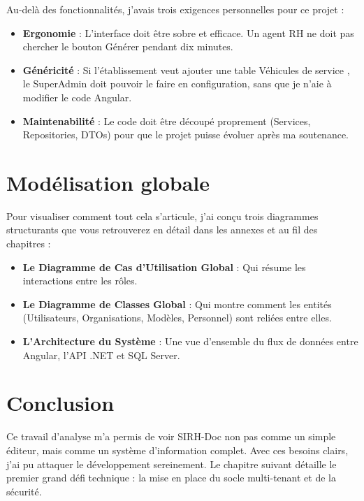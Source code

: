 Au-delà des fonctionnalités, j'avais trois exigences personnelles pour ce projet :
\begin{itemize}
    \item \textbf{Ergonomie} : L'interface doit être sobre et efficace. Un agent RH ne doit pas chercher le bouton \og Générer \fg{} pendant dix minutes.
    \item \textbf{Généricité} : Si l'établissement veut ajouter une table \og Véhicules de service \fg{}, le SuperAdmin doit pouvoir le faire en configuration, sans que je n'aie à modifier le code Angular.
    \item \textbf{Maintenabilité} : Le code doit être découpé proprement (Services, Repositories, DTOs) pour que le projet puisse évoluer après ma soutenance.
\end{itemize}

\section{Modélisation globale}

Pour visualiser comment tout cela s'articule, j'ai conçu trois diagrammes structurants que vous retrouverez en détail dans les annexes et au fil des chapitres :
\begin{itemize}
    \item \textbf{Le Diagramme de Cas d'Utilisation Global} : Qui résume les interactions entre les rôles.
    \item \textbf{Le Diagramme de Classes Global} : Qui montre comment les entités (Utilisateurs, Organisations, Modèles, Personnel) sont reliées entre elles.
    \item \textbf{L'Architecture du Système} : Une vue d'ensemble du flux de données entre Angular, l'API .NET et SQL Server.
\end{itemize}

\section{Conclusion}

Ce travail d'analyse m'a permis de voir SIRH-Doc non pas comme un simple éditeur, mais comme un système d'information complet. Avec ces besoins clairs, j'ai pu attaquer le développement sereinement. Le chapitre suivant détaille le premier grand défi technique : la mise en place du socle multi-tenant et de la sécurité.
